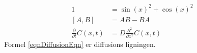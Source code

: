 \documentclass{article}
\begin{document}
\begin{align}
1
	& = \sin(x)^2 + \cos(x)^2					\\
\left[A, B\right]
	& = AB - BA									\\
\label{eqnDiffusionEqn}
\frac{\partial }{\partial t} C(x, t)
	& = D \frac{\partial^2}{\partial x^2} C(x, t)
\end{align}
Formel \eqref{eqnDiffusionEqn} er diffusions ligningen.
\end{document}
